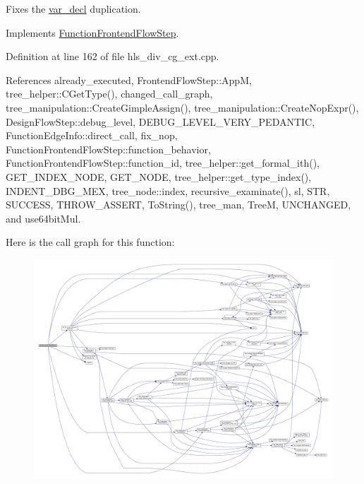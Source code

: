 Fixes the \hyperlink{structvar__decl}{var\+\_\+decl} duplication. 



Implements \hyperlink{classFunctionFrontendFlowStep_a00612f7fb9eabbbc8ee7e39d34e5ac68}{Function\+Frontend\+Flow\+Step}.



Definition at line 162 of file hls\+\_\+div\+\_\+cg\+\_\+ext.\+cpp.



References already\+\_\+executed, Frontend\+Flow\+Step\+::\+AppM, tree\+\_\+helper\+::\+C\+Get\+Type(), changed\+\_\+call\+\_\+graph, tree\+\_\+manipulation\+::\+Create\+Gimple\+Assign(), tree\+\_\+manipulation\+::\+Create\+Nop\+Expr(), Design\+Flow\+Step\+::debug\+\_\+level, D\+E\+B\+U\+G\+\_\+\+L\+E\+V\+E\+L\+\_\+\+V\+E\+R\+Y\+\_\+\+P\+E\+D\+A\+N\+T\+IC, Function\+Edge\+Info\+::direct\+\_\+call, fix\+\_\+nop, Function\+Frontend\+Flow\+Step\+::function\+\_\+behavior, Function\+Frontend\+Flow\+Step\+::function\+\_\+id, tree\+\_\+helper\+::get\+\_\+formal\+\_\+ith(), G\+E\+T\+\_\+\+I\+N\+D\+E\+X\+\_\+\+N\+O\+DE, G\+E\+T\+\_\+\+N\+O\+DE, tree\+\_\+helper\+::get\+\_\+type\+\_\+index(), I\+N\+D\+E\+N\+T\+\_\+\+D\+B\+G\+\_\+\+M\+EX, tree\+\_\+node\+::index, recursive\+\_\+examinate(), sl, S\+TR, S\+U\+C\+C\+E\+SS, T\+H\+R\+O\+W\+\_\+\+A\+S\+S\+E\+RT, To\+String(), tree\+\_\+man, TreeM, U\+N\+C\+H\+A\+N\+G\+ED, and use64bit\+Mul.

Here is the call graph for this function\+:
\nopagebreak
\begin{figure}[H]
\begin{center}
\leavevmode
\includegraphics[width=350pt]{de/d52/classhls__div__cg__ext_ad7e670a6ce48646651b6fe689e3d85d4_cgraph}
\end{center}
\end{figure}
\mbox{\label{classhls__div__cg__ext_a9c9f6aebf0e63e7997a0258bfc98213a}} 
